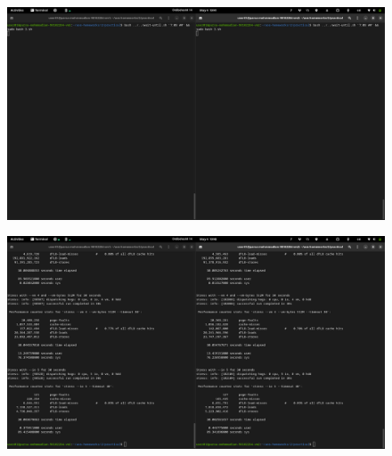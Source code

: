 \documentclass{article}
\begin{document}
\subsection{}
\begin{figure}[H]
   \centering
   \includegraphics[width=\linewidth]{3-2-command.png}
\end{figure}
\begin{figure}[H]
   \centering
   \includegraphics[width=\linewidth]{3-2-result.png}
\end{figure}
\end{document}

